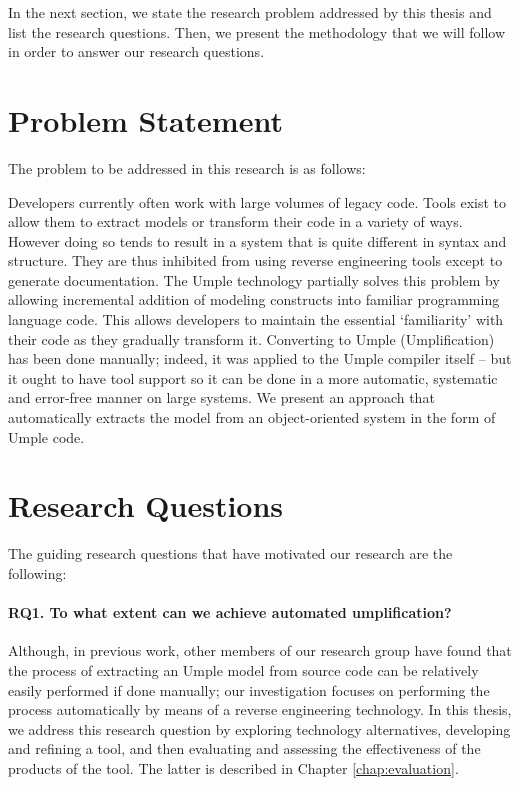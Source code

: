 In the next section, we state the research problem addressed by this thesis and list the research questions. Then, we present the methodology that we will follow in order to answer our research questions.

\section{Problem Statement}
The problem to be addressed in this research is as follows:

Developers currently often work with large volumes of legacy code. Tools exist to allow them to extract models or transform their code in a variety of ways. However doing so tends to result in a system that is quite different in syntax and structure. They are thus inhibited from using reverse engineering tools except to generate documentation. The Umple technology partially solves this problem by allowing incremental addition of modeling constructs into familiar programming language code. This allows developers to maintain the essential `familiarity' with their code as they gradually transform it. Converting to Umple (Umplification) has been done manually; indeed, it was applied to the Umple compiler itself \cite{Lethbridge2010c} –  but it ought to have tool support so it can be done in a more automatic, systematic and error-free manner on large systems. We present an approach that automatically extracts the model from an object-oriented system in the form of Umple code. 

\section{Research Questions}

The guiding research questions that have motivated our research are the following:
\paragraph*{RQ1. To what extent can we achieve automated umplification?}
Although, in previous work, other members of our research group have found that the process of extracting an Umple model from source code can be relatively easily performed if done manually; our investigation focuses on performing the process automatically by means of a reverse engineering technology. 
In this thesis, we address this research question by exploring technology alternatives, developing and refining a tool, and then evaluating and assessing the effectiveness of the products of the tool. The latter is described in Chapter \ref{chap:evaluation}.
